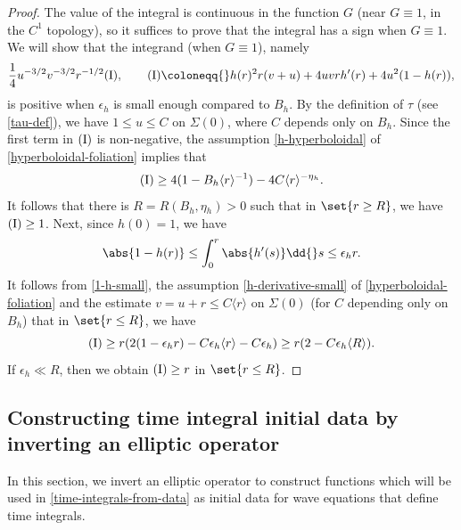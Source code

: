 \documentclass[10pt, reqno]{amsart}
\begin{document}
\begin{proof}
The value of the integral is continuous in the function \(G\) (near
\(G\equiv 1\), in the \(C^1\) topology), so it suffices to prove that the
integral has a sign when \(G\equiv 1\). We will show that the integrand (when \(G\equiv
1\)), namely
\begin{equation}
\frac{1}{4}u^{-3/2}v^{-3/2}r^{-1/2}\textnormal{(I)},\qquad \textnormal{(I)}\coloneqq{}h(r)^2r(v+u) + 4uvrh'(r) + 4u^2(1-h(r)),
\end{equation}
is positive when \(\epsilon_h\) is small enough compared to \(B_h\). By the definition
of \(\tau{}\) (see \cref{tau-def}), we have \(1\le u\le C\) on \(\Sigma{}(0)\),
where \(C\) depends only on \(B_h\). Since the first term in
\(\textnormal{(I)}\) is non-negative, the assumption \cref{h-hyperboloidal} of
\cref{hyperboloidal-foliation} implies that
\begin{equation}
\textnormal{(I)}\ge 4(1-B_h\langle{}r\rangle{}^{-1}) - 4C\langle{}r\rangle^{-\eta{}_h}.
\end{equation}
It follows that there is \(R = R(B_h,\eta{}_h) > 0\) such that in \(\set{r\ge R}\), we
have \(\textnormal{(I)}\ge 1\). Next, since \(h(0) = 1\), we have
\begin{equation}\label{1-h-small}
\abs{1-h(r)}\le \int_0^r \abs{h'(s)}\dd{}s \le \epsilon{}_hr.
\end{equation}
It follows from \cref{1-h-small}, the assumption \cref{h-derivative-small} of
\cref{hyperboloidal-foliation} and the estimate \(v = u+r\le C\langle{}r\rangle{}\) on \(\Sigma{}(0)\) (for
\(C\) depending only on \(B_h\)) that in \(\set{r\le R}\), we have
\begin{equation}
\textnormal{(I)}\ge r(2(1-\epsilon{}_hr) - C\epsilon{}_h\langle{}r\rangle{} - C\epsilon{}_h)\ge r(2 - C\epsilon{}_h\langle{}R\rangle{}).
\end{equation}
If \(\epsilon_h\ll R\), then we obtain \(\textnormal{(I)}\ge r\) in \(\set{r\le R}\).
\end{proof}
\subsection{Constructing time integral initial data by inverting an elliptic operator}
\label{time-integral-elliptic} In this section, we invert an elliptic operator to
construct functions which will be used in \cref{time-integrals-from-data} as
initial data for wave equations that define time integrals.
\end{document}
